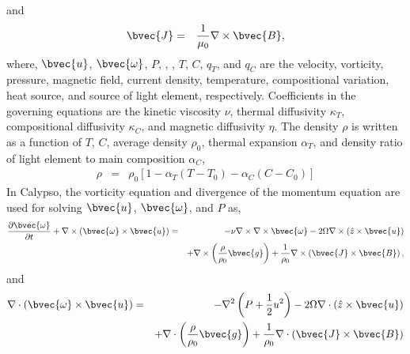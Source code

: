 %
and
\begin{eqnarray}
\bvec{J} & = & \frac{1}{\mu_{0}} \nabla \times \bvec{B},
\label{eq:def_current}
\end{eqnarray}
%
where, $\bvec{u}$, $\bvec{\omega}$, $P$, , , $T$, $C$, $q_{T}$, and $q_{C}$ are the velocity, vorticity, pressure, magnetic field, current density, temperature, compositional variation, heat source, and source of light element, respectively. Coefficients in the governing equations are the kinetic viscosity $\nu$, thermal diffusivity $\kappa_{T}$, compositional diffusivity $\kappa_{C}$, and magnetic diffusivity $\eta$. The density $\rho$ is written as a function of $T$, $C$, average density $\rho_{0}$, thermal expansion $\alpha_{T}$, and density ratio of light element to main composition $\alpha_{C}$,
%
\begin{eqnarray}
\rho & = & \rho_{0} \left[1 - \alpha_{T} \left( T - T_{0} \right)
                               - \alpha_{C} \left( C - C_{0} \right) \right]
\label{eq:def_density}
\end{eqnarray}
%
In Calypso, the vorticity equation and divergence of the momentum equation are used for solving $\bvec{u}$, $\bvec{\omega}$, and $P$ as,
\begin{eqnarray}
\frac{\partial \bvec{\omega}}{\partial t} + \nabla \times \left(\bvec{\omega} \times \bvec{u}\right)
 & = & -\nu \nabla \times \nabla \times \bvec{\omega}
     - 2 \Omega \nabla \times \left(\hat{z} \times \bvec{u} \right)
\nonumber \\
 & & + \nabla \times \left( \frac{\rho}{\rho_{0}} \bvec{g} \right)
     + \frac{1}{\rho_{0}} \nabla \times \left(\bvec{J} \times \bvec{B} \right),
\label{eq:vorticity_eq}
\end{eqnarray}
%
and
\begin{eqnarray}
\nabla \cdot \left(\bvec{\omega} \times \bvec{u}\right)
 & = & -\nabla^{2} \left(P+\frac{1}{2}u^{2} \right) - 2 \Omega \nabla \cdot \left(\hat{z} \times \bvec{u} \right)
\nonumber \\
 & & + \nabla \cdot \left( \frac{\rho}{\rho_{0}} \bvec{g} \right)
     + \frac{1}{\rho_{0}} \nabla \cdot \left(\bvec{J} \times \bvec{B} \right)
\label{eq:div_momentum}
\end{eqnarray}


